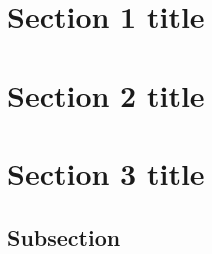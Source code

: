 \section{Section 1 title}

\section{Section 2 title}

\section{Section 3 title}

\subsection{Subsection}